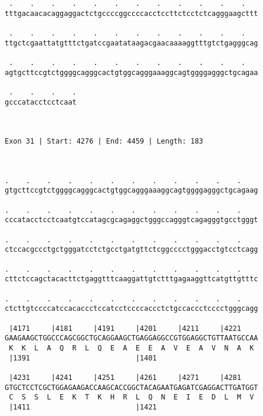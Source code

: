 \documentclass{article}
\begin{document}
\begin{Verbatim}
 .    .    .    .    .    .    .    .    .    .    .    .   
tttgacaacacaggaggactctgccccggccccacctccttctcctctcagggaagcttt
                                                            
 .    .    .    .    .    .    .    .    .    .    .    .   
ttgctcgaattatgtttctgatccgaatataagacgaacaaaaggtttgtctgagggcag
                                                            
 .    .    .    .    .    .    .    .    .    .    .    .   
agtgcttccgtctggggcagggcactgtggcagggaaaggcagtggggagggctgcagaa
                                                            
 .    .    .    .
gcccatacctcctcaat
                 
                 
 
Exon 31 | Start: 4276 | End: 4459 | Length: 183



.    .    .    .    .    .    .    .    .    .    .    .    
gtgcttccgtctggggcagggcactgtggcagggaaaggcagtggggagggctgcagaag
                                                            
.    .    .    .    .    .    .    .    .    .    .    .    
cccatacctcctcaatgtccatagcgcagaggctgggccagggtcagagggtgcctgggt
                                                            
.    .    .    .    .    .    .    .    .    .    .    .    
ctccacgccctgctgggatcctctgcctgatgttctcggcccctgggacctgtcctcagg
                                                            
.    .    .    .    .    .    .    .    .    .    .    .    
cttctccagctacacttctgaggtttcaaggattgtctttgagaaggttcatgttgtttc
                                                            
.    .    .    .    .    .    .    .    .    .    .    .    
ctcttgtccccatccacaccctccatcctccccaccctctgccaccctcccctgggcagg
                                                            
 |4171     |4181     |4191     |4201     |4211     |4221    
GAAGAAGCTGGCCCAGCGGCTGCAGGAAGCTGAGGAGGCCGTGGAGGCTGTTAATGCCAA
 K  K  L  A  Q  R  L  Q  E  A  E  E  A  V  E  A  V  N  A  K 
 |1391                         |1401                        
  
 |4231     |4241     |4251     |4261     |4271     |4281    
GTGCTCCTCGCTGGAGAAGACCAAGCACCGGCTACAGAATGAGATCGAGGACTTGATGGT
 C  S  S  L  E  K  T  K  H  R  L  Q  N  E  I  E  D  L  M  V 
 |1411                         |1421                        
  

\end{Verbatim}
\end{document}
